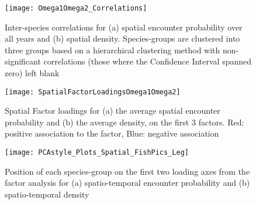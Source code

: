 \documentclass{nature}
\begin{document}




\begin{figure}
\begin{center}
	\texttt{[image: Omega1Omega2\_Correlations]}
	\label{fig:1}
	\caption{Inter-species correlations for (a) spatial encounter
		probability over all years and (b) spatial density.
		Species-groups are clustered into three groups based on a
		hierarchical clustering method with non-significant
		correlations (those where the Confidence Interval spanned zero)
		left blank}
\end{center}
\end{figure}

\begin{figure}
\begin{center}
	\texttt{[image: SpatialFactorLoadingsOmega1Omega2]}
	\label{fig:2}
	\caption{Spatial Factor loadings for (a) the average spatial encounter
		probability and (b) the average density,  on the first 3
		factors. Red: positive association to the factor, Blue:
		negative association}
\end{center}
\end{figure}

\begin{figure}
\begin{center}
	\texttt{[image: PCAstyle\_Plots\_Spatial\_FishPics\_Leg]}
	\label{fig:3}
	\caption{Position of each species-group on the first two loading axes from the
	factor analysis for (a) spatio-temporal encounter probability and (b)
	spatio-temporal density}
\end{center}
\end{figure}
\end{document}
